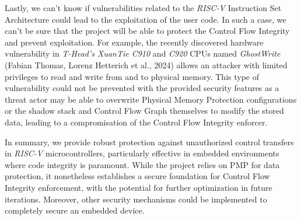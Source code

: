 Lastly, we can't know if vulnerabilities related to the \textit{RISC-V} Instruction
Set Architecture could lead to the exploitation of the user code. In such a case,
we can't be sure that the project will be able to protect the Control Flow Integrity
and prevent exploitation. For example, the recently discovered hardware vulnerability
in \textit{T-Head's XuanTie C910} and \textit{C920} CPUs named \textit{GhostWrite}
(Fabian Thomas, Lorenz Hetterich et al., 2024)\cite{riscvuzz} allows an attacker
with limited privileges to read and write from and to physical memory. This type
of vulnerability could not be prevented with the provided security features as a
threat actor may be able to overwrite Physical Memory Protection configurations or
the shadow stack and Control Flow Graph themselves to modify the stored data,
leading to a compromisation of the Control Flow Integrity enforcer.

In summary, we provide robust protection against unauthorized control transfers in
\textit{RISC-V} microcontrollers, particularly effective in embedded environments
where code integrity is paramount. While the project relies on PMP for data
protection, it nonetheless establishes a secure foundation for Control Flow Integrity
enforcement, with the potential for further optimization in future iterations. Moreover,
other security mechanisms could be implemented to completely secure an embedded
device.